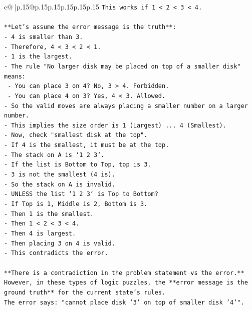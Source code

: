 \documentclass{article}
\begin{document}
{\begin{supertabular}{c@{$\;$}|p{.15\linewidth}@{}p{.15\linewidth}p{.15\linewidth}p{.15\linewidth}p{.15\linewidth}p{.15\linewidth}}
{{{\texttt{This works if 1 < 2 < 3 < 4.} \\
\\ 
\texttt{**Let's assume the error message is the truth**:} \\
\texttt{{-} 4 is smaller than 3.} \\
\texttt{{-} Therefore, 4 < 3 < 2 < 1.} \\
\texttt{{-} 1 is the largest.} \\
\texttt{{-} The rule "No larger disk may be placed on top of a smaller disk" means:} \\
\texttt{  {-} You can place 3 on 4? No, 3 > 4. Forbidden.} \\
\texttt{  {-} You can place 4 on 3? Yes, 4 < 3. Allowed.} \\
\texttt{{-} So the valid moves are always placing a smaller number on a larger number.} \\
\texttt{{-} This implies the size order is 1 (Largest) ... 4 (Smallest).} \\
\texttt{{-} Now, check "smallest disk at the top".} \\
\texttt{{-} If 4 is the smallest, it must be at the top.} \\
\texttt{{-} The stack on A is `1 2 3`.} \\
\texttt{{-} If the list is Bottom to Top, top is 3.} \\
\texttt{{-} 3 is not the smallest (4 is).} \\
\texttt{{-} So the stack on A is invalid.} \\
\texttt{{-} UNLESS the list `1 2 3` is Top to Bottom?} \\
\texttt{{-} If Top is 1, Middle is 2, Bottom is 3.} \\
\texttt{{-} Then 1 is the smallest.} \\
\texttt{{-} Then 1 < 2 < 3 < 4.} \\
\texttt{{-} Then 4 is largest.} \\
\texttt{{-} Then placing 3 on 4 is valid.} \\
\texttt{{-} This contradicts the error.} \\
\\ 
\texttt{**There is a contradiction in the problem statement vs the error.**} \\
\texttt{However, in these types of logic puzzles, the **error message is the ground truth** for the current state's rules.} \\
\texttt{The error says: "cannot place disk '3' on top of smaller disk '4'".} \\
}}}
\end{supertabular}}
\end{document}
